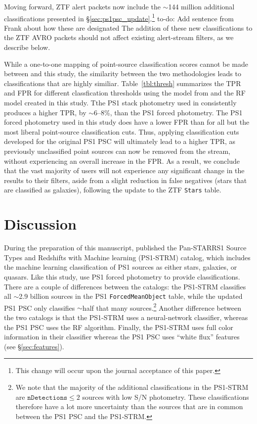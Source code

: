 \documentclass[twocolumn]{aastex63}
\newcommand{\todo}[1]{{\color{magenta} to-do: {#1}}}
\begin{document}
Moving forward, ZTF alert packets now include the $\sim$144 million additional
classifications presented in \S\ref{sec:ps1psc_update}.\footnote{This change
will occur upon the journal acceptance of this paper.} \todo{Add sentence from
Frank about how these are designated} The addition of these new
classifications to the ZTF AVRO packets should not affect existing
alert-stream filters, as we describe below.



While a one-to-one mapping of point-source classification scores cannot be
made between \citet{Tachibana18} and this study, the similarity between the
two methodologies leads to classifications that are highly similiar.
Table~\ref{tbl:thresh} summarizes the TPR and FPR for different classfication
thresholds using the model from \citet{Tachibana18} and the RF model created
in this study. Tthe PS1 stack photometry used in \citet{Tachibana18}
consistently produces a higher TPR, by $\sim$6--8\%, than the PS1 forced
photometry. The PS1 forced photometry used in this study does have a lower FPR
than \citet{Tachibana18} for all but the most liberal point-source
classification cuts. Thus, applying classification cuts developed for the
original PS1 PSC will ultimately lead to a higher TPR, as previously
unclassified point sources can now be removed from the stream, without
experiencing an overall increase in the FPR. As a result, we conclude that the
vast majority of users will not experience any significant change in the
results to their filters, aside from a slight reduction in false negatives
(stars that are classified as galaxies), following the update to the ZTF
\texttt{Stars} table.

\section{Discussion}\label{sec:discussion}

During the preparation of this manuscript, \citet{Beck20} published the
Pan-STARRS1 Source Types and Redshifts with Machine learning (PS1-STRM)
catalog, which includes the machine learning classification of PS1 sources as
either stars, galaxies, or quasars. Like this study, \citet{Beck20} use PS1
forced photometry to provide classifications. There are a couple of
differences between the catalogs: the PS1-STRM classifies all $\sim$2.9
billion sources in the PS1 \texttt{ForcedMeanObject} table, while the updated
PS1 PSC only classifies $\sim$half that many sources.\footnote{We note that
the majority of the additional classifications in the PS1-STRM are
$\mathtt{nDetections} \le 2$ sources with low S/N photometry. These
classifications therefore have a lot more uncertainty than the sources that
are in common between the PS1 PSC and the PS1-STRM.} Another difference
between the two catalogs is that the PS1-STRM uses a neural-network
classifier, whereas the PS1 PSC uses the RF algorithm. Finally, the PS1-STRM
uses full color information in their classifier whereas the PS1 PSC uses
``white flux'' features (see \S\ref{sec:features}).
\end{document}
